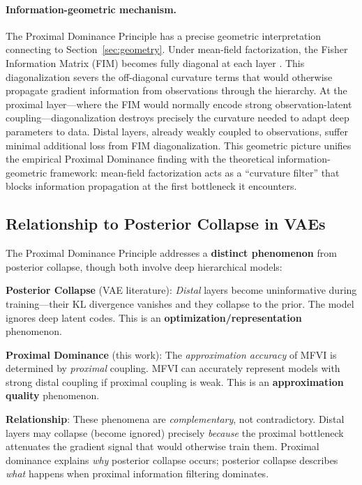 \documentclass[10pt]{article} %
\theoremstyle{plain}
\theoremstyle{definition}
\begin{document}
\paragraph{Information-geometric mechanism.} The Proximal Dominance Principle has a precise geometric interpretation connecting to Section~\ref{sec:geometry}. Under mean-field factorization, the Fisher Information Matrix (FIM) becomes fully diagonal at each layer \citep{amari2016information}. This diagonalization severs the off-diagonal curvature terms that would otherwise propagate gradient information from observations through the hierarchy. At the proximal layer---where the FIM would normally encode strong observation-latent coupling---diagonalization destroys precisely the curvature needed to adapt deep parameters to data. Distal layers, already weakly coupled to observations, suffer minimal additional loss from FIM diagonalization. This geometric picture unifies the empirical Proximal Dominance finding with the theoretical information-geometric framework: mean-field factorization acts as a ``curvature filter'' that blocks information propagation at the first bottleneck it encounters.

\subsection{Relationship to Posterior Collapse in VAEs}

\begin{tcolorbox}[breakable, colback=red!5, colframe=red!50!black, title=\textbf{Critical Distinction: Proximal Dominance vs. Posterior Collapse}, fonttitle=\bfseries]
The Proximal Dominance Principle addresses a \textbf{distinct phenomenon} from posterior collapse, though both involve deep hierarchical models:

\textbf{Posterior Collapse} (VAE literature): \emph{Distal} layers become uninformative during training---their KL divergence vanishes and they collapse to the prior. The model ignores deep latent codes. This is an \textbf{optimization/representation} phenomenon.

\textbf{Proximal Dominance} (this work): The \emph{approximation accuracy} of MFVI is determined by \emph{proximal} coupling. MFVI can accurately represent models with strong distal coupling if proximal coupling is weak. This is an \textbf{approximation quality} phenomenon.

\textbf{Relationship}: These phenomena are \emph{complementary}, not contradictory. Distal layers may collapse (become ignored) precisely \emph{because} the proximal bottleneck attenuates the gradient signal that would otherwise train them. Proximal dominance explains \emph{why} posterior collapse occurs; posterior collapse describes \emph{what} happens when proximal information filtering dominates.
\end{tcolorbox}
\end{document}
